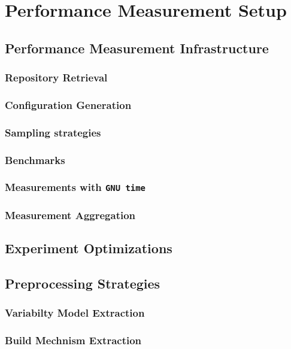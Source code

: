 \documentclass[
	12pt,
	a4paper,
	oneside,
	openright
]{book}
\begin{document}
\chapter{Performance Measurement Setup}\label{chapter:3}

\section{Performance Measurement Infrastructure}

\subsection{Repository Retrieval}
\subsection{Configuration Generation}
\citep{batory_feature_2005}


\subsection{Sampling strategies}
\subsection{Benchmarks}
\subsection{Measurements with \texttt{GNU time}}
\subsection{Measurement Aggregation}



\section{Experiment Optimizations}

\section{Preprocessing Strategies}
\subsection{Variabilty Model Extraction}
\subsection{Build Mechnism Extraction}
\end{document}
